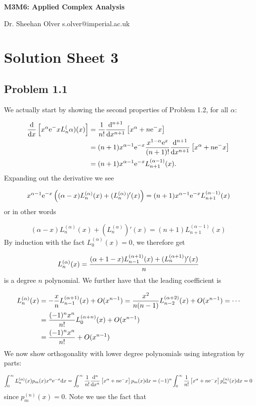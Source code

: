 \documentclass[12pt,a4paper]{article}
\def\D{ {\rm d} }
\def\E{ {\rm e} }
\def\addtab#1={#1\;&=}
\def\ccr{\\\addtab}
\def\dx{\D x}
\def\pr(#1){\left({#1}\right)}
\def\br[#1]{\left[{#1}\right]}
\def\addtab#1={#1\;&=}
\def\ccr{\\\addtab}
\begin{document}
\textbf{M3M6: Applied Complex Analysis}

Dr. Sheehan Olver s.olver@imperial.ac.uk

\section{Solution Sheet 3}
\subsection{Problem 1.1}
We actually start by showing the second properties of Problem 1.2, for all $\alpha$:


\begin{align*}
{\D \over \dx} \br[x^\alpha \E^{-x} L_n^{(\alpha)}(x)] &= {1 \over n!}  {\D^{n+1} \over \dx^{n+1}}\br[x^{\alpha+n}\E^{-x}] \ccr
= (n+1)x^{\alpha-1}\E^{-x}  {x^{1-\alpha} \E^{x} \over (n+1)!}{ \D^{n+1} \over \dx^{n+1}}\br[x^{\alpha+n}\E^{-x}] \ccr
= (n+1) x^{\alpha-1}\E^{-x} L_{n+1}^{(\alpha-1)}(x).
\end{align*}
Expanding out the derivative we see

\[
x^{\alpha-1} \E^{-x}\pr({(\alpha -x)L_n^{(\alpha)}(x) + (L_n^{(\alpha)})'(x)}) = (n+1) x^{\alpha-1}\E^{-x} L_{n+1}^{(\alpha-1)}(x)
\]
or in other words

\[
(\alpha -x)L_n^{(\alpha)}(x) + (L_n^{(\alpha)})'(x) = (n+1) L_{n+1}^{(\alpha-1)}(x)
\]
By induction with the fact $L_0^{(\alpha)}(x) = 0$, we therefore get 

\[
L_n^{(\alpha)}(x) = {(\alpha+1 -x)L_{n-1}^{(\alpha+1)}(x) + (L_n^{(\alpha+1)})'(x) \over n}
\]
is a degree $n$ polynomial. We further have that the leading coefficient is


\begin{align*}
L_n^{(\alpha)}(x) &= -{x \over n} L_{n-1}^{(\alpha+1)}(x) +O(x^{n-1}) =   {x^2 \over n(n-1)} L_{n-2}^{(\alpha+2)}(x) +O(x^{n-1}) = \cdots \ccr
= {(-1)^n x^n \over n!} L_0^{(\alpha+n)}(x) +O(x^{n-1}) \\
&= {(-1)^n x^n \over n!} +O(x^{n-1})
\end{align*}
We now show orthogonality with lower degree polynomials using integration by parts:

\[
\int_0^\infty L_n^{(\alpha)}(x) p_m(x) x^\alpha \E^{-x} \dx = 
\int_0^\infty  {1 \over n!} {\D^n \over \dx^n}\br[x^{\alpha+n}\E^{-x}]  p_m(x)  \dx = (-1)^n \int_0^\infty  {1 \over n!} \br[x^{\alpha+n}\E^{-x}]  p_m^{(n)}(x)  \dx = 0
\]
since $p_m^{(n)}(x) = 0$. Note we use the fact that
\end{document}
